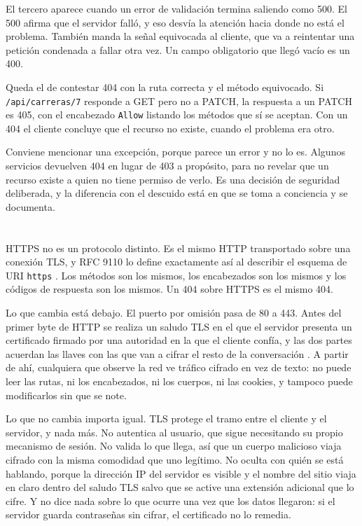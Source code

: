 \documentclass[10pt,a4paper]{article}
\begin{document}
El tercero aparece cuando un error de validación termina saliendo como 500. El 500 afirma que el servidor falló, y eso desvía la atención hacia donde no está el problema. También manda la señal equivocada al cliente, que va a reintentar una petición condenada a fallar otra vez. Un campo obligatorio que llegó vacío es un 400.

Queda el de contestar 404 con la ruta correcta y el método equivocado. Si \texttt{/api/carreras/7} responde a GET pero no a PATCH, la respuesta a un PATCH es 405, con el encabezado \texttt{Allow} listando los métodos que sí se aceptan. Con un 404 el cliente concluye que el recurso no existe, cuando el problema era otro.

Conviene mencionar una excepción, porque parece un error y no lo es. Algunos servicios devuelven 404 en lugar de 403 a propósito, para no revelar que un recurso existe a quien no tiene permiso de verlo. Es una decisión de seguridad deliberada, y la diferencia con el descuido está en que se toma a conciencia y se documenta.

\section{\color{colorIPN}{Qué cambia con HTTPS}}

HTTPS no es un protocolo distinto. Es el mismo HTTP transportado sobre una conexión TLS, y RFC 9110 lo define exactamente así al describir el esquema de URI \texttt{https} \cite{rfc9110}. Los métodos son los mismos, los encabezados son los mismos y los códigos de respuesta son los mismos. Un 404 sobre HTTPS es el mismo 404.

Lo que cambia está debajo. El puerto por omisión pasa de 80 a 443. Antes del primer byte de HTTP se realiza un saludo TLS en el que el servidor presenta un certificado firmado por una autoridad en la que el cliente confía, y las dos partes acuerdan las llaves con las que van a cifrar el resto de la conversación \cite{rfc8446}. A partir de ahí, cualquiera que observe la red ve tráfico cifrado en vez de texto: no puede leer las rutas, ni los encabezados, ni los cuerpos, ni las cookies, y tampoco puede modificarlos sin que se note.

Lo que no cambia importa igual. TLS protege el tramo entre el cliente y el servidor, y nada más. No autentica al usuario, que sigue necesitando su propio mecanismo de sesión. No valida lo que llega, así que un cuerpo malicioso viaja cifrado con la misma comodidad que uno legítimo. No oculta con quién se está hablando, porque la dirección IP del servidor es visible y el nombre del sitio viaja en claro dentro del saludo TLS salvo que se active una extensión adicional que lo cifre. Y no dice nada sobre lo que ocurre una vez que los datos llegaron: si el servidor guarda contraseñas sin cifrar, el certificado no lo remedia.
\end{document}
